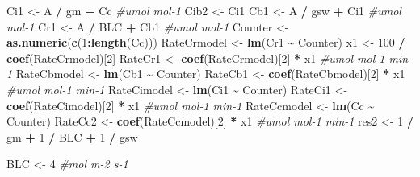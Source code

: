 \documentclass[
]{krantz}
\makeatletter
\newenvironment{Shaded}{\begin{snugshade}}{\end{snugshade}}
\newcommand{\CommentTok}[1]{\textcolor[rgb]{0.56,0.35,0.01}{\textit{#1}}}
\newcommand{\DecValTok}[1]{\textcolor[rgb]{0.00,0.00,0.81}{#1}}
\newcommand{\KeywordTok}[1]{\textcolor[rgb]{0.13,0.29,0.53}{\textbf{#1}}}
\newcommand{\NormalTok}[1]{#1}
\newcommand{\OperatorTok}[1]{\textcolor[rgb]{0.81,0.36,0.00}{\textbf{#1}}}
\newcommand{\StringTok}[1]{\textcolor[rgb]{0.31,0.60,0.02}{#1}}
\newenvironment{kframe}{%
\medskip{}
\setlength{\fboxsep}{.8em}
 \def\at@end@of@kframe{}%
 \ifinner\ifhmode%
  \def\at@end@of@kframe{\end{minipage}}%
  \begin{minipage}{\columnwidth}%
 \fi\fi%
 \def\FrameCommand##1{\hskip\@totalleftmargin \hskip-\fboxsep
 \colorbox{shadecolor}{##1}\hskip-\fboxsep
     \hskip-\linewidth \hskip-\@totalleftmargin \hskip\columnwidth}%
 \MakeFramed {\advance\hsize-\width
   \@totalleftmargin\z@ \linewidth\hsize
   \@setminipage}}%
 {\par\unskip\endMakeFramed%
 \at@end@of@kframe}
\renewenvironment{Shaded}{\begin{kframe}}{\end{kframe}}
\makeatother
\begin{document}
\begin{Shaded}
\begin{Highlighting}[]
\NormalTok{Ci1 \textless{}{-}}\StringTok{ }\NormalTok{A }\OperatorTok{/}\StringTok{ }\NormalTok{gm }\OperatorTok{+}\StringTok{ }\NormalTok{Cc }\CommentTok{\#umol mol{-}1}
\NormalTok{Cib2 \textless{}{-}}\StringTok{ }\NormalTok{Ci1}
\NormalTok{Cb1 \textless{}{-}}\StringTok{ }\NormalTok{A }\OperatorTok{/}\StringTok{ }\NormalTok{gsw }\OperatorTok{+}\StringTok{ }\NormalTok{Ci1 }\CommentTok{\#umol mol{-}1}
\NormalTok{Cr1 \textless{}{-}}\StringTok{ }\NormalTok{A }\OperatorTok{/}\StringTok{ }\NormalTok{BLC }\OperatorTok{+}\StringTok{ }\NormalTok{Cb1 }\CommentTok{\#umol mol{-}1}
\NormalTok{Counter \textless{}{-}}\StringTok{ }\KeywordTok{as.numeric}\NormalTok{(}\KeywordTok{c}\NormalTok{(}\DecValTok{1}\OperatorTok{:}\KeywordTok{length}\NormalTok{(Cc)))}
\NormalTok{RateCrmodel \textless{}{-}}\StringTok{ }\KeywordTok{lm}\NormalTok{(Cr1 }\OperatorTok{\textasciitilde{}}\StringTok{ }\NormalTok{Counter)}
\NormalTok{x1 \textless{}{-}}\StringTok{ }\DecValTok{100} \OperatorTok{/}\StringTok{ }\KeywordTok{coef}\NormalTok{(RateCrmodel)[}\DecValTok{2}\NormalTok{]}
\NormalTok{RateCr1 \textless{}{-}}\StringTok{ }\KeywordTok{coef}\NormalTok{(RateCrmodel)[}\DecValTok{2}\NormalTok{] }\OperatorTok{*}\StringTok{ }\NormalTok{x1 }\CommentTok{\#umol mol{-}1 min{-}1}
\NormalTok{RateCbmodel \textless{}{-}}\StringTok{ }\KeywordTok{lm}\NormalTok{(Cb1 }\OperatorTok{\textasciitilde{}}\StringTok{ }\NormalTok{Counter)}
\NormalTok{RateCb1 \textless{}{-}}\StringTok{ }\KeywordTok{coef}\NormalTok{(RateCbmodel)[}\DecValTok{2}\NormalTok{] }\OperatorTok{*}\StringTok{ }\NormalTok{x1 }\CommentTok{\#umol mol{-}1 min{-}1}
\NormalTok{RateCimodel \textless{}{-}}\StringTok{ }\KeywordTok{lm}\NormalTok{(Ci1 }\OperatorTok{\textasciitilde{}}\StringTok{ }\NormalTok{Counter)}
\NormalTok{RateCi1 \textless{}{-}}\StringTok{ }\KeywordTok{coef}\NormalTok{(RateCimodel)[}\DecValTok{2}\NormalTok{] }\OperatorTok{*}\StringTok{ }\NormalTok{x1 }\CommentTok{\#umol mol{-}1 min{-}1}
\NormalTok{RateCcmodel \textless{}{-}}\StringTok{ }\KeywordTok{lm}\NormalTok{(Cc }\OperatorTok{\textasciitilde{}}\StringTok{ }\NormalTok{Counter)}
\NormalTok{RateCc2 \textless{}{-}}\StringTok{ }\KeywordTok{coef}\NormalTok{(RateCcmodel)[}\DecValTok{2}\NormalTok{] }\OperatorTok{*}\StringTok{ }\NormalTok{x1 }\CommentTok{\#umol mol{-}1 min{-}1}
\NormalTok{res2 \textless{}{-}}\StringTok{ }\DecValTok{1} \OperatorTok{/}\StringTok{ }\NormalTok{gm }\OperatorTok{+}\StringTok{ }\DecValTok{1} \OperatorTok{/}\StringTok{ }\NormalTok{BLC }\OperatorTok{+}\StringTok{ }\DecValTok{1} \OperatorTok{/}\StringTok{ }\NormalTok{gsw}

\NormalTok{BLC \textless{}{-}}\StringTok{ }\DecValTok{4} \CommentTok{\#mol m{-}2 s{-}1}


\end{Highlighting}
\end{Shaded}
\end{document}
